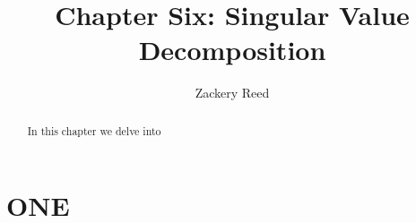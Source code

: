 \documentclass{xourse}
\title{Chapter Six: Singular Value Decomposition}
\author{Zackery Reed}
\begin{document}
\begin{abstract}
    In this chapter we delve into 
\end{abstract}
\maketitle

\part{ONE}
\sectionstyle
\end{document}
